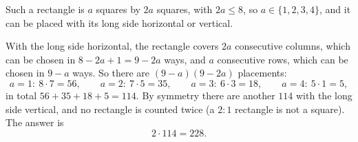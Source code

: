 Such a rectangle is $a$ squares by $2a$ squares, with $2a\le 8$, so $a\in\{1,2,3,4\}$, and it can be placed with its long side horizontal or vertical.

With the long side horizontal, the rectangle covers $2a$ consecutive columns, which can be chosen in $8-2a+1=9-2a$ ways, and $a$ consecutive rows, which can be chosen in $9-a$ ways. So there are $(9-a)(9-2a)$ placements:
\[
a=1:\ 8\cdot7=56,\qquad a=2:\ 7\cdot5=35,\qquad a=3:\ 6\cdot3=18,\qquad a=4:\ 5\cdot1=5 ,
\]
in total $56+35+18+5=114$. By symmetry there are another $114$ with the long side vertical, and no rectangle is counted twice (a $2:1$ rectangle is not a square). The answer is
\[
2\cdot114=\boxed{228}.
\]

